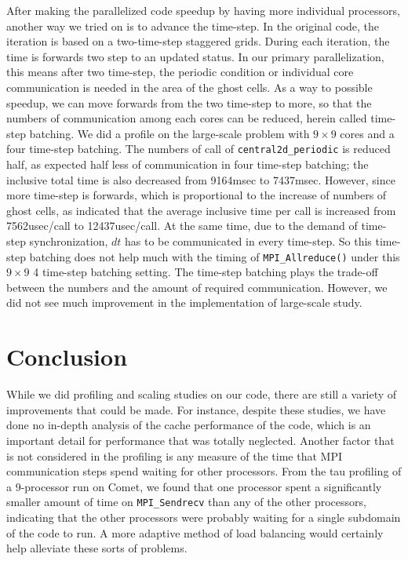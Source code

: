 \documentclass{article}
\begin{document}
After making the parallelized code speedup by having more individual processors, another way we tried on is to advance the time-step. In the original code, the iteration is based on a two-time-step staggered grids. During each iteration, the time is forwards two step to an updated status. In our primary parallelization, this means after two time-step, the periodic condition or individual core communication is needed in the area of the ghost cells. As a way to possible speedup, we can move forwards from the two time-step to more, so that the numbers of communication among each cores can be reduced, herein called time-step batching. We did a profile on the large-scale problem with $9\times9$ cores and a four time-step batching. The numbers of call of \texttt{central2d\_periodic} is reduced half, as expected half less of communication in four time-step batching; the inclusive total time is also decreased from 9164msec to 7437msec. However, since more time-step is forwards, which is proportional to the increase of numbers of ghost cells, as indicated that the average inclusive time per call is increased from 7562usec/call to 12437usec/call. At the same time, due to the demand of time-step synchronization, $dt$ has to be communicated in every time-step. So this time-step batching does not help much with the timing of \texttt{MPI\_Allreduce()} under this $9\times9$ 4 time-step batching setting. The time-step batching plays the trade-off between the numbers and the amount of required communication. However, we did not see much improvement in the implementation of large-scale study.



\section{Conclusion}
While we did profiling and scaling studies on our code, there are still a variety of improvements that could be made. For instance, despite these studies, we have done no in-depth analysis of the cache performance of the code, which is an important detail for performance that was totally neglected. Another factor that is not considered in the profiling is any measure of the time that MPI communication steps spend waiting for other processors. From the tau profiling of a 9-processor run on Comet, we found that one processor spent a significantly smaller amount of time on \texttt{MPI\_Sendrecv} than any of the other processors, indicating that the other processors were probably waiting for a single subdomain of the code to run. A more adaptive method of load balancing would certainly help alleviate these sorts of problems. 
\end{document}

